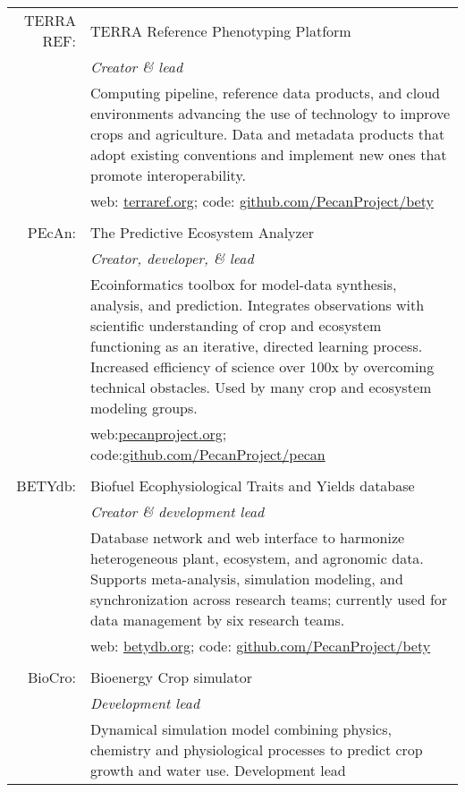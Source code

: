 \documentclass[a4paper,10pt]{article}
\begin{document}
\begin{tabular}{rp{11cm}}
TERRA REF:&TERRA Reference Phenotyping Platform\\
& \small \textit{Creator \& lead}\\
& \small Computing pipeline, reference data products, and cloud environments advancing the use of technology to improve crops and agriculture. Data and metadata products that adopt existing conventions and implement new ones that promote interoperability.\\
& \small web: \href{http://www.terraref.org}{terraref.org}; code:  \href{https://github.com/terraref}{github.com/PecanProject/bety}\\
\multicolumn{2}{c}{} \\
PEcAn:&The Predictive Ecosystem Analyzer\\
& \small \textit{Creator, developer, \& lead}\\
& \small Ecoinformatics toolbox for model-data synthesis, analysis, and prediction. Integrates observations with scientific understanding of crop and ecosystem functioning as an iterative, directed learning process. Increased efficiency of science over 100x by overcoming technical obstacles. Used by many crop and ecosystem modeling groups.\\
& \small web:\href{http://www.pecanproject.org}{pecanproject.org};  code:\href{https://github.com/PecanProject/pecan}{github.com/PecanProject/pecan}\\
\multicolumn{2}{c}{} \\
BETYdb:&Biofuel Ecophysiological Traits and Yields database\\
& \small \textit{Creator \& development lead}\\
& \small{Database network and web interface to harmonize heterogeneous plant, ecosystem, and agronomic data. Supports meta-analysis, simulation modeling, and synchronization across research teams; currently used for data management by six research teams.}\\
& \small web: \href{http://www.betydb.org}{betydb.org}; code:  \href{https://github.com/PecanProject/bety}{github.com/PecanProject/bety}\\
\multicolumn{2}{c}{} \\
BioCro:&Bioenergy Crop simulator\\
& \small \textit{Development lead}\\
& \small Dynamical simulation model combining physics, chemistry and physiological processes to predict crop growth and water use. Development lead\\

\end{tabular}
\end{document}
